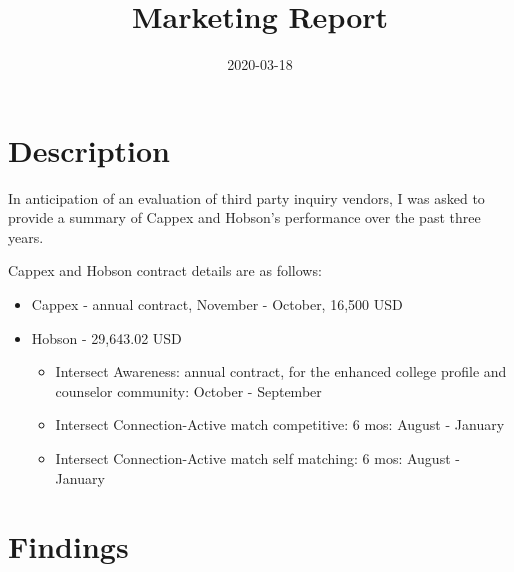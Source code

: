 \documentclass[]{tufte-handout}
\title{Marketing Report}
\date{2020-03-18}
\begin{document}
\maketitle




\hypertarget{description}{%
\section{Description}\label{description}}

In anticipation of an evaluation of third party inquiry vendors, I was
asked to provide a summary of Cappex and Hobson's performance over the
past three years.

Cappex and Hobson contract details are as follows:

\begin{itemize}
\item
  Cappex - annual contract, November - October, 16,500 USD
\item
  Hobson - 29,643.02 USD

  \begin{itemize}
  \item
    Intersect Awareness: annual contract, for the enhanced college
    profile and counselor community: October - September
  \item
    Intersect Connection-Active match competitive: 6 mos: August -
    January
  \item
    Intersect Connection-Active match self matching: 6 mos: August -
    January
  \end{itemize}
\end{itemize}

\hypertarget{findings}{%
\section{Findings}\label{findings}}
\end{document}
